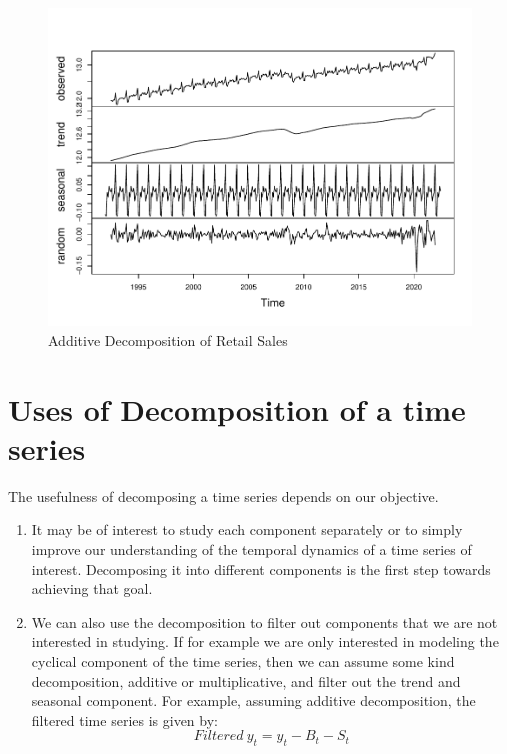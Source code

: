 \documentclass[]{book}
\theoremstyle{definition}
\theoremstyle{definition}
\theoremstyle{definition}
\theoremstyle{remark}
\begin{document}
\begin{figure}

{\centering \includegraphics[width=0.8\linewidth]{bookdown-demo_files/figure-latex/ch3-figure1-1} 

}

\caption{Additive Decomposition of Retail Sales}\label{fig:ch3-figure1}
\end{figure}

\hypertarget{uses-of-decomposition-of-a-time-series}{%
\section{Uses of Decomposition of a time
series}\label{uses-of-decomposition-of-a-time-series}}

The usefulness of decomposing a time series depends on our objective.

\begin{enumerate}
\def\labelenumi{\arabic{enumi}.}
\item
  It may be of interest to study each component separately or to simply
  improve our understanding of the temporal dynamics of a time series of
  interest. Decomposing it into different components is the first step
  towards achieving that goal.
\item
  We can also use the decomposition to filter out components that we are
  not interested in studying. If for example we are only interested in
  modeling the cyclical component of the time series, then we can assume
  some kind decomposition, additive or multiplicative, and filter out
  the trend and seasonal component. For example, assuming additive
  decomposition, the filtered time series is given by: \begin{equation}
  Filtered \ y_t= y_t-B_t-S_t
  \end{equation}
\end{enumerate}
\end{document}
